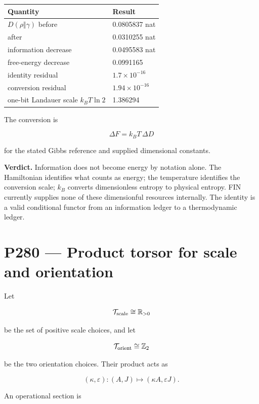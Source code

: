 \documentclass[11pt,a4paper,openany]{report}
\begin{document}
\begin{center}
\begingroup\small
\setlength{\tabcolsep}{2.5pt}
\renewcommand{\arraystretch}{1.16}
\begin{longtable}{@{}p{}p{}@{}}
\toprule
\textbf{Quantity} & \textbf{Result} \\
\midrule
\endhead
\(D(\rho\Vert\gamma)\) before & 0.0805837 nat \\
after & 0.0310255 nat \\
information decrease & 0.0495583 nat \\
free-energy decrease & 0.0991165 \\
identity residual & \(1.7\times10^{-16}\) \\
conversion residual & \(1.94\times10^{-16}\) \\
one-bit Landauer scale \(k_BT\ln2\) & 1.386294 \\
\bottomrule
\end{longtable}
\endgroup
\end{center}

The conversion is

\[
\Delta F=k_BT\,\Delta D
\]

for the stated Gibbs reference and supplied dimensional constants.

\textbf{Verdict.} Information does not become energy by notation alone. The Hamiltonian identifies what counts as energy; the temperature identifies the conversion scale; \(k_B\) converts dimensionless entropy to physical entropy. FIN currently supplies none of these dimensionful resources internally. The identity is a valid conditional functor from an information ledger to a thermodynamic ledger.

\chapter{P280 --- Product torsor for scale and orientation}

Let

\[
\mathcal T_{\rm scale}\cong\mathbb R_{>0}
\]

be the set of positive scale choices, and let

\[
\mathcal T_{\rm orient}\cong\mathbb Z_2
\]

be the two orientation choices. Their product acts as

\[
(\kappa,\varepsilon):
(A,J)
\longmapsto
(\kappa A,\varepsilon J).
\]

An operational section is
\end{document}
